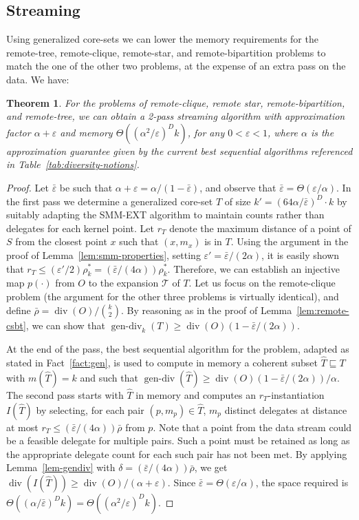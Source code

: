 \documentclass{article}
\newtheorem{theorem}{Theorem}
\DeclareMathOperator{\diversity}{div}
\DeclareMathOperator{\gendiv}{gen-div}
\renewcommand{\epsilon}{\varepsilon}
\newcommand{\BT}[1]{\Theta\left( #1 \right)}
\begin{document}
\subsection{Streaming}
Using generalized core-sets we can lower the memory requirements for
the  remote-tree, remote-clique, remote-star, and remote-bipartition
problems to match the one of the other two problems, at the expense of
an extra pass on the data. We have:
\begin{theorem}\label{thm-2-pass-gen}
  For the problems of remote-clique, remote star, remote-bipartition,
  and remote-tree, we can obtain a 2-pass streaming algorithm with
  approximation factor $\alpha+\epsilon$ and memory
  $\BT{(\alpha^2/\epsilon)^Dk}$, for any $0< \epsilon <1$, where
  $\alpha$ is the approximation guarantee given by the current best
  sequential algorithms referenced in
  Table~\ref{tab:diversity-notions}.
\end{theorem}
\begin{proof}
Let $\bar{\epsilon}$ be such that $\alpha+\epsilon =
\alpha/(1-\bar{\epsilon})$, and observe that $\bar{\epsilon} =
\BT{\epsilon/\alpha}$. In the first pass we determine a generalized
core-set $T$ of size $k'=(64\alpha/\bar{\epsilon})^D\cdot k$ by
suitably adapting the {\sc SMM-EXT} algorithm to maintain counts
rather than delegates for each kernel point. Let $r_T$ denote the
maximum distance of a point of $S$ from the closest point $x$ such
that $(x,m_x)$ is in $T$.  Using the argument in the proof of
Lemma~\ref{lem:smm-properties}, setting $\epsilon' = \bar{\epsilon}/(2
\alpha)$, it is easily shown that $r_T \leq (\epsilon'/2) \rho_k^* =
(\bar{\epsilon}/(4\alpha)) \rho_k^*$. Therefore, we can establish an
injective map $p(\cdot)$ from $O$ to the expansion $\mathcal{T}$ of
$T$. Let us focus on the remote-clique problem (the argument for the
other three problems is virtually identical), and define $\bar{\rho} =
\diversity(O) /{k\choose 2}$. By reasoning as in the proof of
Lemma~\ref{lem:remote-csbt}, we can show that $\gendiv_k(T) \geq
\diversity(O)(1-\bar{\epsilon}/(2\alpha))$.

At the end of the pass, the best sequential algorithm for the problem,
adapted as stated in Fact~\ref{fact:gen}, is used to compute in memory
a coherent subset $\hat{T} \sqsubseteq T$ with $m(\hat{T})= k$ and
such that
$\gendiv(\hat{T}) \geq
\diversity(O)(1-\bar{\epsilon}/(2\alpha))/\alpha$.  The second pass
starts with $\hat{T}$ in memory and computes an $r_T$-instantiation
$I(\hat{T})$ by selecting, for each pair $(p,m_p) \in \hat{T}$, $m_p$
distinct delegates at distance at most
$r_T \leq (\bar{\epsilon}/(4\alpha)) \bar{\rho}$ from $p$.  Note that
a point from the data stream could be a feasible delegate for multiple
pairs. Such a point must be retained as long as the appropriate
delegate count for each such pair has not been met.  By applying
Lemma~\ref{lem-gendiv} with $\delta=(\bar{\epsilon}/(4\alpha)) \bar{\rho}$,
we get $\diversity(I(\hat{T})) \geq \diversity(O)/(\alpha+\epsilon)$.
Since $\bar{\epsilon} = \BT{\epsilon/\alpha}$, the space required is
$\BT{(\alpha/\bar{\epsilon})^D k} =
\BT{(\alpha^2/\epsilon)^D k}$.
\end{proof}
\end{document}
